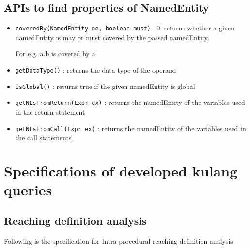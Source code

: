 \documentclass[11pt,a4paper,openright]{report}
\begin{document}
\section{APIs to find properties of NamedEntity}
\begin{itemize}
 \item \texttt{coveredBy(NamedEntity ne, boolean must)} : it returns whether a given namedEntity is may or must covered by the passed namedEntity.
 
 For e.g. a.b is covered by a
 \item \texttt{getDataType()} : returns the data type of the operand

 \item \texttt{isGlobal()} : returns true if the given namedEntity is global
 \item \texttt{getNEsFromReturn(Expr ex)} : returns the namedEntity of the variables used in the return statement
 \item \texttt{getNEsFromCall(Expr ex)} : returns the namedEntity of the variables used in the call statements
\end{itemize}


\chapter{Specifications of developed kulang queries}\label{ap:C}
\section{Reaching definition analysis}
Following is the specification for Intra-procedural reaching definition analysis.
\end{document}
